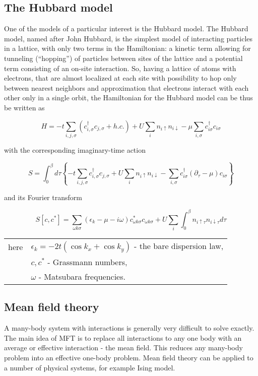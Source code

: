 \subsection{The Hubbard model}\label{sec:hubbard}
One of the models of a particular interest is the Hubbard model.
The Hubbard model, named after John Hubbard, is the simplest model of interacting particles in a lattice,
 with only two terms in the Hamiltonian: a kinetic term allowing for tunneling (``hopping'') of particles between sites of the lattice 
 and a potential term consisting of an on-site interaction.
So, having a lattice of atoms with electrons, that are almost localized at each site with possibility to hop
only between nearest neighbors and approximation that electrons interact with each other only in a single orbit, 
the Hamiltonian for the Hubbard model can be thus be written as

\begin{equation} H = -t \sum_{i,j,\sigma}(c_{i,\sigma}^\dagger c_{j,\sigma} + h.c.)+ U\sum_i n_{i\uparrow}n_{i\downarrow} - \mu\sum_{i,\sigma}c_{i\sigma}^\dagger c_{i\sigma} \end{equation}

with the corresponding imaginary-time action

\begin{equation} S = \int_0^\beta d\tau \left\{
  -t \sum_{i,j,\sigma}c_{i,\sigma}^\dagger c_{j,\sigma} + U\sum_i n_{i\uparrow}n_{i\downarrow} - \sum_{i,\sigma}c_{i\sigma}^\dagger (\partial_\tau-\mu) c_{i\sigma} \right\} \end{equation}

and its Fourier transform

\begin{equation} S[c,c^*] = \sum_{\omega k \sigma}(\epsilon_k-\mu-i\omega)c_{\omega k \sigma}^* c_{\omega k \sigma} + U\sum_i\int_0^\beta n_{i\uparrow\tau}n_{i\downarrow\tau} d\tau \end{equation}
 
\begin{tabular}{rl}
  here & $\epsilon_k = -2t(\cos{k_x}+\cos{k_y})$ - the bare dispersion law, \\
  & $c,c^*$ - Grassmann numbers, \\
  & $\omega$ - Matsubara frequencies.
\end{tabular}

\subsection{Mean field theory}
A many-body system with interactions is generally very difficult to solve exactly.
The main idea of MFT is to replace all interactions to any one body with an average or effective interaction - the mean field.
This reduces any many-body problem into an effective one-body problem.
Mean field theory can be applied to a number of physical systems, for example Ising model.

